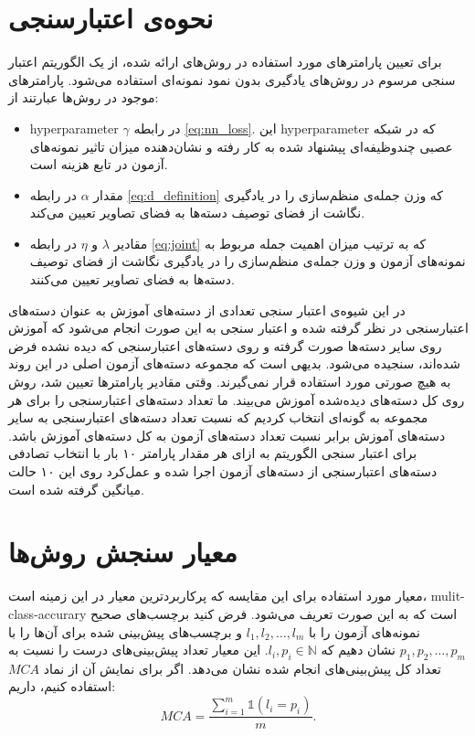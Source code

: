 \section{نحوه‌ی اعتبارسنجی}\label{exp:validation}
برای تعیین پارامترهای مورد استفاده در روش‌های ارائه شده،  از یک الگوریتم اعتبار سنجی مرسوم در روش‌های یادگیری بدون نمود نمونه‌ای استفاده می‌شود.
پارامترهای موجود در روش‌ها عبارتند از:
\begin{itemize}
\item
 \gls{hyperparameter} $\gamma$ در رابطه \eqref{eq:nn_loss}. این \gls{hyperparameter} که در شبکه عصبی چندوظیفه‌ای پیشنهاد شده به کار رفته و نشان‌دهنده میزان تاثیر نمونه‌های آزمون در تابع هزینه است.
\item
مقدار $\alpha$ در رابطه \eqref{eq:d_definition} که وزن جمله‌ی منظم‌سازی را در یادگیری نگاشت از فضای توصیف دسته‌ها به فضای تصاویر تعیین می‌کند.
\item
مقادیر  $\lambda$ و $\eta$ در رابطه \eqref{eq:joint} که به ترتیب میزان اهمیت جمله مربوط به نمونه‌های آزمون و وزن جمله‌ی منظم‌سازی را در یادگیری نگاشت از فضای توصیف دسته‌ها به فضای تصاویر  تعیین می‌کنند.
\end{itemize}
در این شیوه‌ی اعتبار سنجی تعدادی از دسته‌های آموزش به عنوان دسته‌های اعتبارسنجی در نظر گرفته شده و اعتبار سنجی به این صورت انجام می‌شود که آموزش روی سایر دسته‌ها صورت گرفته و روی دسته‌های اعتبارسنجی که دیده نشده فرض شده‌اند، سنجیده می‌شود. بدیهی است که مجموعه‌ دسته‌های آزمون اصلی در این روند به هیچ صورتی مورد استفاده قرار نمی‌گیرند. وقتی مقادیر پارامترها تعیین شد، روش روی کل دسته‌های دیده‌شده آموزش می‌بیند. ما تعداد دسته‌های اعتبارسنجی را برای هر مجموعه به گونه‌ای انتخاب کردیم که نسبت تعداد دسته‌های اعتبارسنجی به سایر دسته‌های آموزش برابر نسبت تعداد دسته‌های آزمون به کل دسته‌های آموزش باشد. برای اعتبار سنجی الگوریتم به ازای هر مقدار پارامتر ۱۰ بار با انتخاب تصادفی دسته‌های اعتبارسنجی از دسته‌های آزمون اجرا شده و عمل‌کرد روی این ۱۰ حالت میانگین گرفته شده است.
%
\section{معیار سنجش روش‌ها}\label{criteria}
 معیار مورد استفاده برای این مقایسه که پرکاربردترین معیار در این زمینه است، \gls{mulit-class-accurary} است که به این صورت تعریف می‌شود. فرض کنید برچسب‌های صحیح نمونه‌های آزمون را با
$l_1, l_2, \ldots, l_m$
و  برچسب‌های پیش‌بینی شده برای آن‌ها را با
$p_1, p_2, \ldots, p_m$
نشان دهیم که
$l_i, p_i \in \mathbb{N}$.
این معیار تعداد پیش‌بینی‌های درست را نسبت به تعداد کل پیش‌بینی‌های انجام شده نشان می‌دهد. اگر برای نمایش آن از نماد $MCA$ استفاده کنیم، داریم:
\begin{equation}
MCA = \frac{\sum_{i=1}^m \mathds{1}(l_i = p_i)}{m}.
\end{equation}
